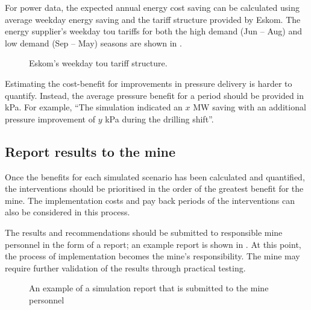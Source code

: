 		For power data, the expected annual energy cost saving can be calculated using average weekday energy saving and the tariff structure provided by Eskom. The energy supplier's weekday \gls{tou} tariffs for both the high demand (Jun -- Aug) and low demand (Sep -- May) seasons are shown in .
		\par 
		\begin{figure}[h]
			\centering
			
			\caption[Eskom's weekday TOU tariff structure]{Eskom's weekday \gls{tou} tariff structure.\protect \footnotemark[1]}
			\label{fig: Tariff}
		\end{figure}
		
		Estimating the cost-benefit for improvements in pressure delivery is harder to quantify. Instead, the average pressure benefit for a period should be provided in kPa. For example, \enquote{The simulation indicated an $x$ MW saving with an additional pressure improvement of $y$ kPa during the drilling shift}.

		\subsection{Report results to the mine}
		Once the benefits for each simulated scenario has been calculated and quantified, the interventions should be prioritised in the order of the greatest benefit for the mine. The implementation costs and pay back periods of the interventions can also be considered in this process.
		\par
		The results and recommendations should be submitted to responsible mine personnel in the form of a report; an example report is shown in . At this point, the process of implementation becomes the mine's responsibility. The mine may require further validation of the results through practical testing.
		\begin{figure}[h]
			\centering
			\caption{An example of a simulation report that is submitted to the mine personnel}
			\label{fig: Report example}
		\end{figure}

